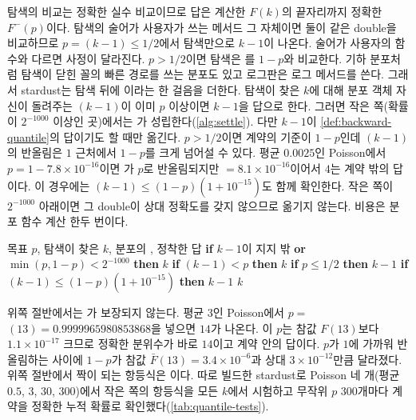 탐색의 비교는 정확한 실수 비교이므로 답은 계산한 $F(k)$의 끝자리까지 정확한 $F^{-}(p)$이다. 탐색의 술어가 사용자가 쓰는  메서드 그 자체이면 둘이 같은 double을 비교하므로 $p=$$(k-1)\le1/2$에서 탐색만으로 $k-1$이 나온다. 술어가 사용자의 함수와 다르면 사정이 달라진다. $p>1/2$이면 탐색은 를 $1-p$와 비교한다. 기하 분포처럼 탐색이 닫힌 꼴의 빠른 경로를 쓰는 분포도 있고 로그판은 로그 메서드를 쓴다. 그래서 stardust는 탐색 뒤에 이라는 한 걸음을 더한다. 탐색이 찾은 $k$에 대해 분포 객체 자신이 돌려주는 $(k-1)$이 이미 $p$ 이상이면 $k-1$을 답으로 한다. 그러면 작은 쪽(확률이 $2^{-1000}$ 이상인 곳)에서는 가 성립한다(\cref{alg:settle}). 다만 $k-1$이 \cref{def:backward-quantile}의 답이기도 할 때만 옮긴다. $p>1/2$이면 계약의 기준이 $1-p$인데 $(k-1)$의 반올림은 $1$ 근처에서 $1-p$를 크게 넘어설 수 있다. 평균 $0.0025$인 Poisson에서 $p=1-7.8\times10^{-16}$이면 가 $p$로 반올림되지만 $=8.1\times10^{-16}$이어서 $4$는 계약 밖의 답이다. 이 경우에는 $(k-1)\le(1-p)(1+10^{-15})$도 함께 확인한다. 작은 쪽이 $2^{-1000}$ 아래이면 그 double이 상대 정확도를 갖지 않으므로 옮기지 않는다. 비용은 분포 함수 계산 한두 번이다.

\begin{algorithm}[htbp]
\begin{algorithmic}[1]
\Require 목표 $p$, 탐색이 찾은 $k$, 분포의 , 
\Ensure 정착한 답
\State \textbf{if} $k-1$이 지지 밖 \textbf{or} $\min(p,1-p)<2^{-1000}$ \textbf{then} \Return $k$
\State \textbf{if} $(k-1)<p$ \textbf{then} \Return $k$ 
\State \textbf{if} $p\le1/2$ \textbf{then} \Return $k-1$
\State \textbf{if} $(k-1)\le(1-p)(1+10^{-15})$ \textbf{then} \Return $k-1$ 
\State \Return $k$
\end{algorithmic}
\caption{원자에서의 정착 (stardust 의 , 의 경우)}
\label{alg:settle}
\end{algorithm}

위쪽 절반에서는 가 보장되지 않는다. 평균 $3$인 Poisson에서 $p=$$(13)=0.9999965980853868$을 넣으면 $14$가 나온다. 이 $p$는 참값 $F(13)$보다 $1.1\times10^{-17}$ 크므로 정확한 분위수가 바로 $14$이고 계약 안의 답이다. $p$가 $1$에 가까워 반올림하는 사이에 $1-p$가 참값 $\bar F(13)=3.4\times10^{-6}$과 상대 $3\times10^{-12}$만큼 달라졌다. 위쪽 절반에서 짝이 되는 항등식은 이다. 따로 빌드한 stardust로 Poisson 네 개(평균 $0.5$, $3$, $30$, $300$)에서 작은 쪽의 항등식을 모든 $k$에서 시험하고 무작위 $p$ $300$개마다 계약을 정확한 누적 확률로 확인했다(\cref{tab:quantile-tests}).

